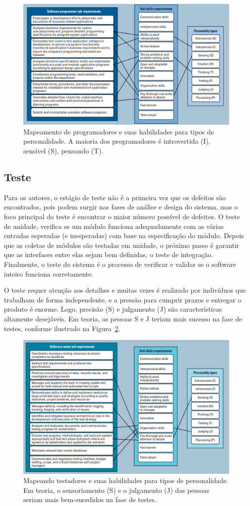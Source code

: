 \documentclass[12pt]{article}
\begin{document}
\begin{figure}[!ht]
\centering
\includegraphics[width=.7\textwidth]{Capturar.PNG}
\caption{Mapeamento de programadores e suas habilidades para tipos de personalidade. A maioria dos programadores é introvertida (I), sensível (S), pensando (T).}
\label{fig:figura3}
\end{figure}

\subsection{Teste}
Para os autores, o estágio de teste não é a primeira vez que os defeitos são encontrados, pois podem surgir nas fases de análise e design do sistema, mas o foco principal do teste é encontrar o maior número possível de defeitos. O teste de unidade, verifica se um módulo funciona adequadamente com as várias entradas esperadas (e inesperadas) com base na especificação do módulo. Depois que as coletas de módulos são testadas em unidade, o próximo passo é garantir que as interfaces entre elas sejam bem definidas, o teste de integração. Finalmente, o teste do sistema é o processo de verificar e validar se o software inteiro funciona corretamente.

O teste requer atenção aos detalhes e muitas vezes é realizado por indivíduos que trabalham de forma independente, e a pressão para cumprir prazos e entregar o produto é enorme. Logo, precisão (S) e julgamento (J) são características altamente desejáveis. Em teoria, as pessoas S e J teriam mais sucesso na fase de testes, conforme ilustrado na Figura~\ref{fig:figura4}.
\begin{figure}[!ht]
\centering
\includegraphics[width=.7\textwidth]{Capturar3.PNG}
\caption{Mapeando testadores e suas habilidades para tipos de personalidade. Em teoria, o sensoriamento (S) e o julgamento (J) das pessoas seriam mais bem-sucedidos na fase de testes.}
\label{fig:figura4}
\end{figure}
\end{document}
